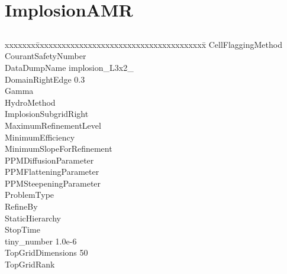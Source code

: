 \documentclass{book}
\begin{document}
\subsection{\cello}

\section{ImplosionAMR} \label{s:ImplosionAMR}

\subsection{\enzo}

{\parametersize
\begin{tabbing}
xxxxxxx\=xxxxxxxxxxxxxxxxxxxxxxxxxxxxxxxxxxxxxxx\=\kill
\> CellFlaggingMethod                \\
\> CourantSafetyNumber             \\
\> DataDumpName              \> implosion\_L3x2\_ \\
\> DomainRightEdge            0.3 \\
\> Gamma                      \\
\> HydroMethod                       \\
\> ImplosionSubgridRight          \\
\> MaximumRefinementLevel            \\
\> MinimumEfficiency               \\
\> MinimumSlopeForRefinement  \\
\> PPMDiffusionParameter      \\
\> PPMFlatteningParameter     \\
\> PPMSteepeningParameter     \\
\> ProblemType                       \\
\> RefineBy                   \\
\> StaticHierarchy                   \\
\> StopTime                   \\
\> tiny\_number               \> 1.0e-6 \\
\> TopGridDimensions          50 \\
\> TopGridRank               
\end{tabbing}}
\end{document}
